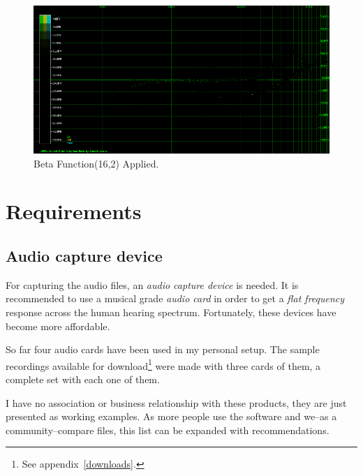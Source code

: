 \documentclass[10pt,a4paper]{report}
\begin{document}
\begin{appendices}
\begin{figure}[H]
	\centering
	\includegraphics[width=1\linewidth]{images/colorfilter/BetaFunctionPlot_5_Data.png}
	\caption[Beta Function(16,2)]{Beta Function(16,2) Applied.}
	\label{fig:betafunctionplot5data}
\end{figure}

\chapter{Requirements}
\label{requirements}
\section{Audio capture device}
\label{audiocards}
For capturing the audio files, an \textit{audio capture device} is needed. It is recommended to use a musical grade \textit{audio card} in order to get a \textit{flat frequency} response across the human hearing spectrum. Fortunately, these devices have become more affordable.

So far four audio cards have been used in my personal setup. The sample recordings available for download\footnote{See appendix~\ref{downloads}.} were made with three cards of them, a complete set with each one of them.

I have no association or business relationship with these products, they are just presented as  working examples. As more people use the software and we--as a community--compare files, this list can be expanded with recommendations.


\end{appendices}
\end{document}

